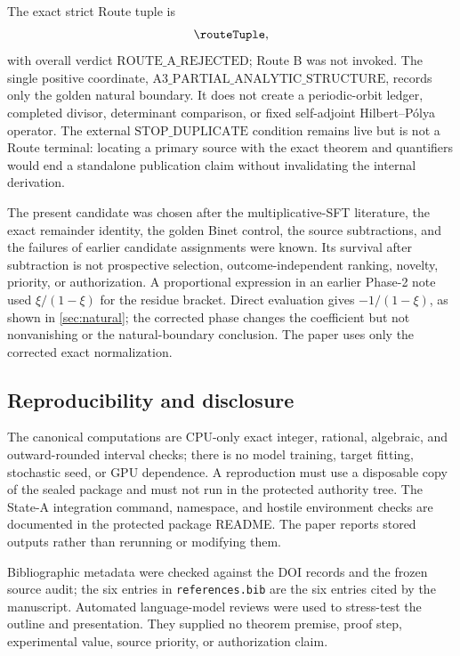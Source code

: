 The exact strict Route tuple is
\[
  \routeTuple,
\]
with overall verdict \(\mathrm{ROUTE\_A\_REJECTED}\); Route B was not
invoked.  The single positive coordinate,
\(\mathrm{A3\_PARTIAL\_ANALYTIC\_STRUCTURE}\), records only the golden
natural boundary.  It does not create a periodic-orbit ledger, completed
divisor, determinant comparison, or fixed self-adjoint
Hilbert--P\'olya operator.  The external
\(\mathrm{STOP\_DUPLICATE}\) condition remains live but is not a Route
terminal: locating a primary source with the exact theorem and quantifiers
would end a standalone publication claim without invalidating the internal
derivation.

The present candidate was chosen after the multiplicative-SFT literature,
the exact remainder identity, the golden Binet control, the source
subtractions, and the failures of earlier candidate assignments were known.
Its survival after subtraction is not prospective selection,
outcome-independent ranking, novelty, priority, or authorization.  A
proportional expression in an earlier Phase-2 note used
\(\xi/(1-\xi)\) for the residue bracket.  Direct evaluation gives
\(-1/(1-\xi)\), as shown in \cref{sec:natural}; the corrected phase changes
the coefficient but not nonvanishing or the natural-boundary conclusion.
The paper uses only the corrected exact normalization.

\subsection{Reproducibility and disclosure}

The canonical computations are CPU-only exact integer, rational, algebraic,
and outward-rounded interval checks; there is no model training, target
fitting, stochastic seed, or GPU dependence.  A reproduction must use a
disposable copy of the sealed package and must not run in the protected
authority tree.  The State-A integration command, namespace, and hostile
environment checks are documented in the protected package README.  The
paper reports stored outputs rather than rerunning or modifying them.

Bibliographic metadata were checked against the DOI records and the frozen
source audit; the six entries in \texttt{references.bib} are the six entries
cited by the manuscript.  Automated language-model reviews were used to
stress-test the outline and presentation.  They supplied no theorem premise,
proof step, experimental value, source priority, or authorization claim.
